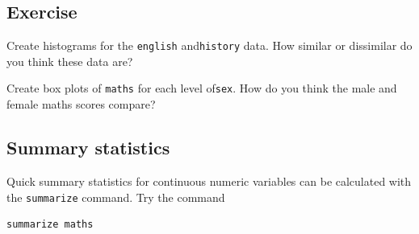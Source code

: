 \documentclass[
]{article}
\begin{document}
\hypertarget{exercise-11}{%
\subsection{Exercise}\label{exercise-11}}

Create histograms for the \texttt{english} and\texttt{history} data. How similar or dissimilar do you think these data are?

Create box plots of \texttt{maths} for each level of\texttt{sex}. How do you think the male and female maths scores compare?

\hypertarget{summary-statistics}{%
\subsection{Summary statistics}\label{summary-statistics}}

Quick summary statistics for continuous numeric variables can be calculated with the \texttt{summarize} command. Try the command

\begin{verbatim}
summarize maths
\end{verbatim}
\end{document}
